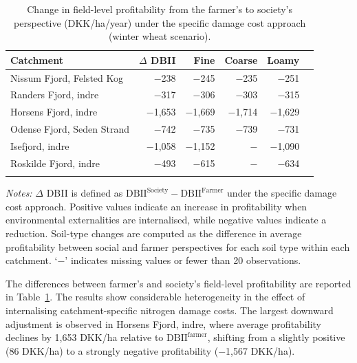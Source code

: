 \documentclass[12pt]{article}
\begin{document}
\begin{table}[H]
\centering
\small
\caption{Change in field-level profitability from the farmer's to society's perspective (DKK/ha/year) under the specific damage cost approach (winter wheat scenario).}
\label{tab:dbii-change-specific}
\begin{threeparttable}

\begin{tabular}{lrrrrr}
\toprule
\textbf{Catchment} & \boldmath$\Delta$ \textbf{DBII} &
\textbf{Fine} & \textbf{Coarse} & \textbf{Loamy} \\
\midrule\addlinespace

Nissum Fjord, Felsted Kog  & $-$238  & $-$245 & $-$235 & $-$251 \\
Randers Fjord, indre       & $-$317  & $-$306 & $-$303 & $-$315 \\
Horsens Fjord, indre       & $-$1,653 & $-$1,669 & $-$1,714 & $-$1,629 \\
Odense Fjord, Seden Strand & $-$742  & $-$735 & $-$739 & $-$731 \\
Isefjord, indre            & $-$1,058 & $-$1,152 & $-$\; & $-$1,090 \\
Roskilde Fjord, indre      & $-$493  & $-$615 & $-$\;  & $-$634 \\
\addlinespace\bottomrule
\end{tabular}


\begin{tablenotes}
\footnotesize
\item \textit{Notes:} $\Delta$ DBII is defined as $\mathrm{\text{DBII}^{Society}} - \mathrm{\text{DBII}^{Farmer}}$ under the specific damage cost approach. 
Positive values indicate an increase in profitability when environmental externalities are internalised, while negative values indicate a reduction. 
Soil-type changes are computed as the difference in average profitability between social and farmer perspectives for each soil type within each catchment. `$-$' indicates missing values or fewer than 20 observations.
\end{tablenotes}

\end{threeparttable}
\end{table}

The differences between farmer's and society's field-level profitability are reported in Table~\ref{tab:dbii-change-specific}. 
The results show considerable heterogeneity in the effect of internalising catchment-specific nitrogen damage costs. 
The largest downward adjustment is observed in Horsens Fjord, indre, where average profitability declines by 1,653 DKK/ha relative to $\mathrm{DBII^{farmer}}$, shifting from a slightly positive (86 DKK/ha) to a strongly negative profitability ($-$1,567 DKK/ha).
\end{document}

